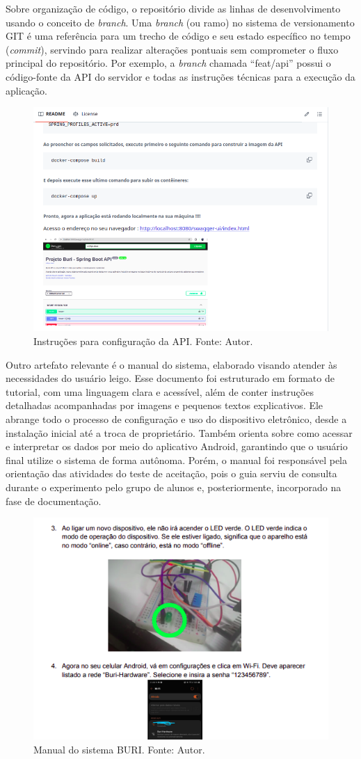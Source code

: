 Sobre organização de código, o repositório divide as linhas de desenvolvimento usando o conceito de \textit{branch}. Uma \textit{branch} (ou ramo) no sistema de versionamento GIT \cite{git-branch} é uma referência 
para um trecho de código e seu estado específico no tempo (\textit{commit}), servindo para realizar alterações pontuais sem comprometer o fluxo principal do repositório. Por exemplo, a \textit{branch} chamada 
``feat/api'' possui o código-fonte da API do servidor e todas as instruções técnicas para a execução da aplicação.

\begin{figure}[ht]
    \centering
    \includegraphics[width=.60\textwidth]{img/github-tcc-readme-api.png}
    \caption{Instruções para configuração da API. Fonte: Autor.}\label{figGithubAPI}
\end{figure}

Outro artefato relevante é o manual do sistema, elaborado visando atender às necessidades do usuário leigo. Esse documento foi estruturado em formato de tutorial, com uma linguagem clara e acessível, além de 
conter instruções detalhadas acompanhadas por imagens e pequenos textos explicativos. Ele abrange todo o processo de configuração e uso do dispositivo eletrônico, desde a instalação inicial até a troca de proprietário. Também 
orienta sobre como acessar e interpretar os dados por meio do aplicativo Android, garantindo que o usuário final utilize o sistema de forma autônoma. Porém, o manual foi responsável 
pela orientação das atividades do teste de aceitação, pois o guia serviu de consulta durante o experimento pelo grupo de alunos e, posteriormente, incorporado na fase de documentação.

\begin{figure}[ht]
    \centering
    \includegraphics[width=.60\textwidth]{img/documentacao-manual.png}
    \caption{Manual do sistema BURI. Fonte: Autor.}\label{figGithubManual}
\end{figure}

